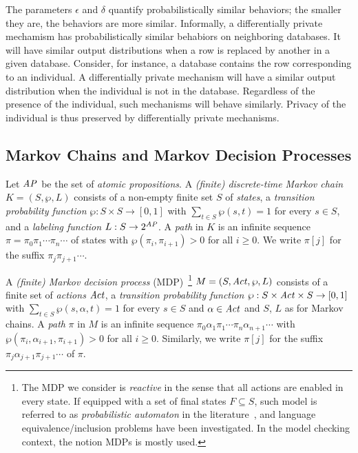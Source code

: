 The parameters $\epsilon$ and $\delta$ quantify probabilistically
similar behaviors;
the smaller they are, the behaviors are more similar.
Informally, a differentially private mechamism has probabilistically
similar behabiors on neighboring databases. It will have similar
output distributions when a row is replaced by another in a given
database. Consider, for instance, a database contains the row
corresponding to an individual. A differentially private mechanism
will have a similar output distribution when the individual is not in
the database. Regardless of the presence of the individual, such
mechanisms will behave similarly. Privacy of the individual is thus
preserved by differentially private mechanisms.

\subsection{Markov Chains and Markov Decision Processes}

Let $\mathit{AP}$ be the set of \emph{atomic propositions}.
A \emph{(finite) discrete-time Markov chain} $K = (S, \wp, L)$ consists
of a non-empty finite set $S$ of \emph{states}, a \emph{transition
  probability function} $\wp : S \times S \rightarrow [0, 1]$ with
$\sum_{t \in S} \wp(s, t) = 1$ for every $s \in S$, and
a \emph{labeling function} $L : S \rightarrow 2^{\mathit{AP}}$. A \emph{path}
in $K$ is an infinite sequence $\pi = \pi_0 \pi_1 \cdots \pi_n \cdots$
of states with $\wp (\pi_i, \pi_{i+1}) > 0$ for all $i \geq 0$. We write
$\pi[j]$ for the suffix $\pi_j \pi_{j+1} \cdots$. %

A \emph{(finite) Markov decision process}
(MDP)~\footnote{The MDP we consider is \emph{reactive} in the sense that
all actions are enabled in every state. If equipped with a set of final states $F\subseteq S$, such model is
referred to as \emph{probabilistic automaton} in the literature~\cite{Rabin63}, and language equivalence/inclusion
problems have been investigated. In the model checking context, the notion MDPs is mostly used.}
 $M = (S, \mathit{Act}, \wp, L)$ consists
of
a finite set of \emph{actions} $\mathit{Act}$,
a \emph{transition probability function} $\wp : S \times \mathit{Act}
\times S \rightarrow [0, 1]$ with $\sum_{t \in S} \wp(s, \alpha, t)
= 1$ for every $s \in S$ and $\alpha \in \mathit{Act}$ and $S$,
$L$ as for Markov chains.
A \emph{path} $\pi$ in $M$ is an infinite sequence $\pi_0 \alpha_1
\pi_1 \cdots \pi_n \alpha_{n+1} \cdots$ with
$\wp(\pi_i, \alpha_{i+1}, \pi_{i+1}) > 0$ for all $i \geq 0$.
Similarly, we write $\pi[j]$ for the suffix $\pi_j \alpha_{j+1}
\pi_{j+1} \cdots$ of $\pi$.

